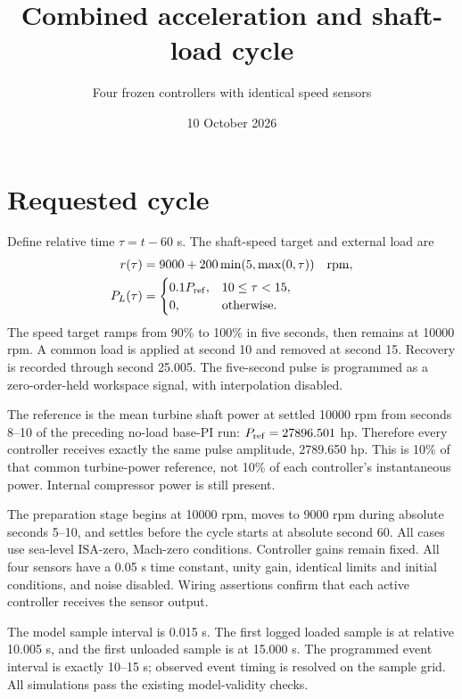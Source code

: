 \documentclass[11pt,a4paper]{article}
\title{Combined acceleration and shaft-load cycle}\author{Four frozen controllers with identical speed sensors}\date{10 October 2026}
\begin{document}
\maketitle
\section{Requested cycle}
Define relative time $\tau=t-60$ s. The shaft-speed target and external load are
\begin{align}
r(\tau)&=9000+200\min(5,\max(0,\tau))\quad\mathrm{rpm},\\
P_L(\tau)&=\begin{cases}0.1P_{\rm ref},&10\le\tau<15,\\0,&\text{otherwise}.\end{cases}
\end{align}
The speed target ramps from 90\% to 100\% in five seconds, then remains at 10000 rpm. A common load is applied at second 10 and removed at second 15. Recovery is recorded through second 25.005. The five-second pulse is programmed as a zero-order-held workspace signal, with interpolation disabled.

The reference is the mean turbine shaft power at settled 10000 rpm from seconds 8--10 of the preceding no-load base-PI run: $P_{\rm ref}=27896.501$ hp. Therefore every controller receives exactly the same pulse amplitude, 2789.650 hp. This is 10\% of that common turbine-power reference, not 10\% of each controller's instantaneous power. Internal compressor power is still present.

The preparation stage begins at 10000 rpm, moves to 9000 rpm during absolute seconds 5--10, and settles before the cycle starts at absolute second 60. All cases use sea-level ISA-zero, Mach-zero conditions. Controller gains remain fixed. All four sensors have a 0.05 s time constant, unity gain, identical limits and initial conditions, and noise disabled. Wiring assertions confirm that each active controller receives the sensor output.

The model sample interval is 0.015 s. The first logged loaded sample is at relative 10.005 s, and the first unloaded sample is at 15.000 s. The programmed event interval is exactly 10--15 s; observed event timing is resolved on the sample grid. All simulations pass the existing model-validity checks.
\end{document}
